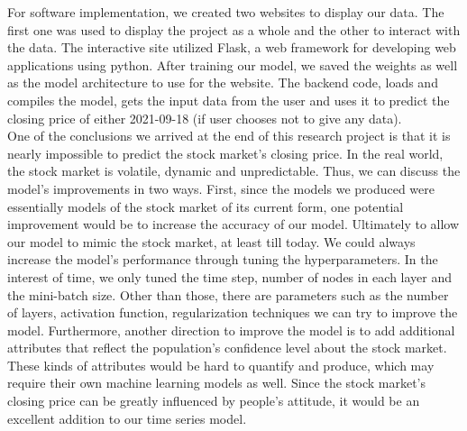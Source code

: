 \documentclass{article}
\begin{document}
For software implementation, we created two websites to display our data. The first one was used to display the project as a whole and the other to interact with the data. The interactive site utilized Flask, a web framework for developing web applications using python. After training our model, we saved the weights as well as the model architecture to use for the website. The backend code, loads and compiles the model, gets the input data from the user and uses it to predict the closing price of either 2021-09-18 (if user chooses not to give any data).\\

One of the conclusions we arrived at the end of this research project is that it is nearly impossible to predict the stock market’s closing price. In the real world, the stock market is volatile, dynamic and unpredictable. Thus, we can discuss the model’s improvements in two ways. First, since the models we produced were essentially models of the stock market of its current form, one potential improvement would be to increase the accuracy of our model. Ultimately to allow our model to mimic the stock market, at least till today. We could always increase the model’s performance through tuning the hyperparameters. In the interest of time, we only tuned the time step, number of nodes in each layer and the mini-batch size. Other than those, there are parameters such as the number of layers, activation function, regularization techniques we can try to improve the model. Furthermore, another direction to improve the model is to add additional attributes that reflect the population’s confidence level about the stock market. These kinds of attributes would be hard to quantify and produce, which may require their own machine learning models as well. Since the stock market’s closing price can be greatly influenced by people’s attitude, it would be an excellent addition to our time series model. 	
\end{document}
